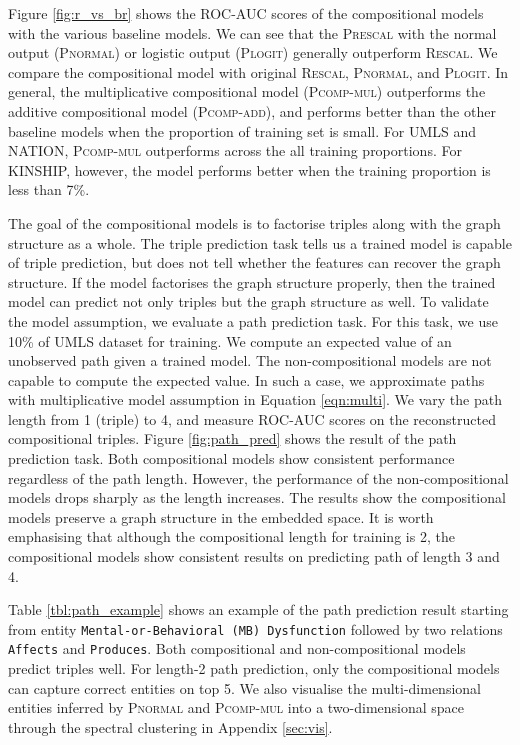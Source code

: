 Figure \ref{fig:r_vs_br} shows the ROC-AUC scores of the compositional models
with the various baseline models. We can see that the \textsc{Prescal} with
the normal output (\textsc{Pnormal}) or logistic output (\textsc{Plogit}) generally outperform \textsc{Rescal}.
We compare the compositional model with original \textsc{Rescal}, \textsc{Pnormal}, and \textsc{Plogit}.
In general, the multiplicative compositional model (\textsc{Pcomp-mul}) outperforms
the additive compositional model (\textsc{Pcomp-add}), and performs better than the other baseline models
when the proportion of training set is small. For UMLS and NATION, \textsc{Pcomp-mul} outperforms
across the all training proportions.
For KINSHIP, however, the model performs better when the training proportion is less than 7\%.

The goal of the compositional models is to factorise triples along with the graph structure as a whole.
The triple prediction task tells us a trained model is capable of triple prediction,
but does not tell whether the features can recover the graph structure.
If the model factorises the graph structure properly,
then the trained model can predict not only triples but the graph structure as well.
To validate the model assumption, we evaluate a path prediction task.
For this task, we use 10\% of UMLS dataset for training.
We compute an expected value of an unobserved path given a trained model.
The non-compositional models are not capable to compute the expected value.
In such a case, we approximate paths with multiplicative model assumption in Equation \ref{eqn:multi}.
We vary the path length from 1 (triple) to 4, and measure ROC-AUC scores on the reconstructed compositional triples.
Figure \ref{fig:path_pred} shows the result of the path prediction task.
Both compositional models show consistent performance regardless of the path length.
However, the performance of the non-compositional models drops sharply as the length increases.
The results show the compositional models preserve a graph structure in the embedded space.
It is worth emphasising that although the compositional length for training is 2,
the compositional models show consistent results on predicting path of length 3 and 4.

Table \ref{tbl:path_example} shows an example of the path prediction result
starting from entity \texttt{Mental-or-Behavioral (MB) Dysfunction} followed by two relations \texttt{Affects} and \texttt{Produces}.
Both compositional and non-compositional models predict triples well.
For length-2 path prediction, only the compositional models can capture correct entities on top 5.
We also visualise the multi-dimensional entities inferred by \textsc{Pnormal} and \textsc{Pcomp-mul}
into a two-dimensional space through the spectral clustering \cite{von2007tutorial}
in Appendix \ref{sec:vis}.


